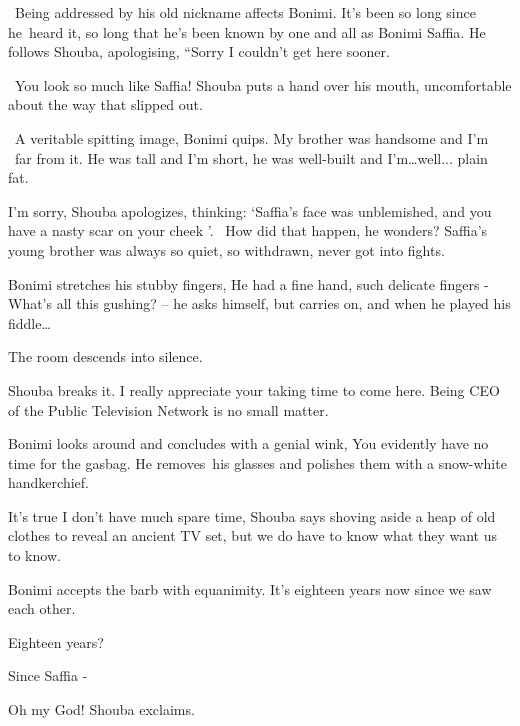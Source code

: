 \documentclass[letterpaper]{article}
\begin{document}
~Being addressed by his old nickname affects Bonimi. It's been so long since he~heard it, so long that he's been known
by\textcolor[rgb]{0.0,0.4392157,0.7529412}{ }one and all as Bonimi Saffia. He follows Shouba, apologising, ``Sorry I
couldn't get here sooner.{\textquotedbl}

~{\textquotedbl}You look so much like Saffia!{\textquotedbl} Shouba puts a hand over his mouth, uncomfortable about the
way that slipped out.

~{\textquotedbl}A veritable spitting image,{\textquotedbl} Bonimi quips. {\textquotedbl}My brother was handsome and I'm
~far from it. He was tall and I'm short, he was well-built and I'm{\dots}well... plain fat. {\textquotedbl} 

{\textquotedbl}I'm sorry,{\textquotedbl} Shouba apologizes, thinking: `Saffia's face was unblemished,
and\textcolor[rgb]{0.0,0.4392157,0.7529412}{ }you have a nasty scar on your cheek '. \ How did that happen, he wonders?
Saffia's young brother was always so quiet, so withdrawn, never got into fights.

Bonimi stretches his stubby fingers, {\textquotedbl}He had a fine hand, such delicate fingers - {\textquotedbl} What's
all this gushing? -- he asks himself, but carries on, {\textquotedbl}and when he played his
fiddle{\dots}{\textquotedbl}

The room descends into silence. 

Shouba breaks it. {\textquotedbl}I really appreciate your taking time to come here. Being CEO of the Public Television
Network is no small matter.{\textquotedbl}

Bonimi looks around and concludes with a genial wink, {\textquotedbl}You evidently have no time for the
gasbag.{\textquotedbl} He removes~his glasses and polishes them with a snow-white handkerchief. 

{\textquotedbl}It's true I don't have much spare time,{\textquotedbl} Shouba says shoving aside a heap of old clothes to
reveal an ancient TV set, {\textquotedbl}but we do have to know what they want us to know.{\textquotedbl}

Bonimi accepts the barb with equanimity. {\textquotedbl}It's eighteen years now since we saw each other.{\textquotedbl} 

{\textquotedbl}Eighteen years?{\textquotedbl}

{\textquotedbl}Since Saffia -{\textquotedbl} 

{\textquotedbl}Oh my God!{\textquotedbl} Shouba exclaims.
\end{document}
